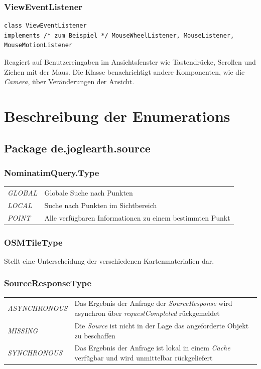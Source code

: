 \documentclass[10pt]{scrreprt}
\begin{document}
\vspace{5mm}
\subsection*{ViewEventListener}
\begin{lstlisting}
class ViewEventListener
implements /* zum Beispiel */ MouseWheelListener, MouseListener, MouseMotionListener
\end{lstlisting}
Reagiert auf Benutzereingaben im Ansichtsfenster wie Tastendrücke, Scrollen und Ziehen mit der Maus. Die Klasse benachrichtigt andere Komponenten, wie die \textit{Camera}, über Veränderungen der Ansicht.\\




\chapter{Beschreibung der Enumerations}
\section{Package de.joglearth.source}

\subsection*{NominatimQuery.Type}
\begin{tabular}{p{4cm} p{11cm}}
\textit{GLOBAL} & Globale Suche nach Punkten \\
\textit{LOCAL} & Suche nach Punkten im Sichtbereich \\
\textit{POINT} & Alle verfügbaren Informationen zu einem bestimmten Punkt \\
\end{tabular}

\vspace{5mm}
\subsection*{OSMTileType}
Stellt eine Unterscheidung der verschiedenen Kartenmaterialien dar.

\vspace{5mm}
\subsection*{SourceResponseType}
\begin{tabular}{p{4cm} p{11cm}}
\textit{ASYNCHRONOUS} & Das Ergebnis der Anfrage der \textit{SourceResponse} wird asynchron über \textit{requestCompleted} rückgemeldet\\
\textit{MISSING} & Die \textit{Source} ist nicht in der Lage das angeforderte Objekt zu beschaffen\\
\textit{SYNCHRONOUS} & Das Ergebnis der Anfrage ist lokal in einem \textit{Cache} verfügbar und wird unmittelbar rückgeliefert \\
\end{tabular}
\end{document}
